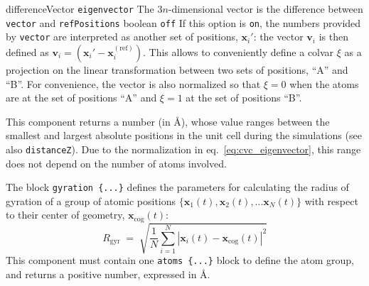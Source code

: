 \begin{cvcoptions}
\item %
  \keydef
    {differenceVector}{%
    \texttt{eigenvector}}{%
    The $3n$-dimensional vector is the difference between \texttt{vector} and \texttt{refPositions}}{%
    boolean}{%
    \texttt{off}}{%
    If this option is \texttt{on}, the numbers provided by \texttt{vector} are interpreted as another set of positions, $\mathbf{x}_{i}'$: the vector $\mathbf{v}_{i}$ is then defined as $\mathbf{v}_{i} = \left(\mathbf{x}_{i}' - \mathbf{x}_{i}^{\mathrm{(ref)}}\right)$.
This allows to conveniently define a colvar $\xi$ as a projection on the linear transformation between two sets of positions, ``A'' and ``B''.
For convenience, the vector is also normalized so that $\xi = 0$ when the atoms are at the set of positions ``A'' and $\xi = 1$ at the set of positions ``B''.
}
\end{cvcoptions}
This component returns a number (in \AA), whose value ranges between
the smallest and largest absolute positions in the unit cell during
the simulations (see also \texttt{distanceZ}).  Due to the
normalization in eq.~\ref{eq:cvc_eigenvector}, this range does not
depend on the number of atoms involved.



The block \texttt{gyration~\{...\}} defines the
parameters for calculating the radius of gyration of a group of atomic
positions $\{ \mathbf{x}_1(t), \mathbf{x}_2(t), \ldots \mathbf{x}_N(t)
\}$ with respect to their center of geometry,
$\mathbf{x}_{\mathrm{cog}}(t)$:
\begin{equation}
  \label{eq:colvar_gyration}
  R_{\mathrm{gyr}} \; = \; \sqrt{ \frac{1}{N}
    \sum_{i=1}^{N} \left|\mathbf{x}_{i}(t) -
      \mathbf{x}_{\mathrm{cog}}(t)\right|^{2} }
\end{equation}
This component must contain one \texttt{atoms~\{...\}} block to
define the atom group, and returns a positive number, expressed in
\AA{}.

\begin{cvcoptions}
\item %
\end{cvcoptions}



